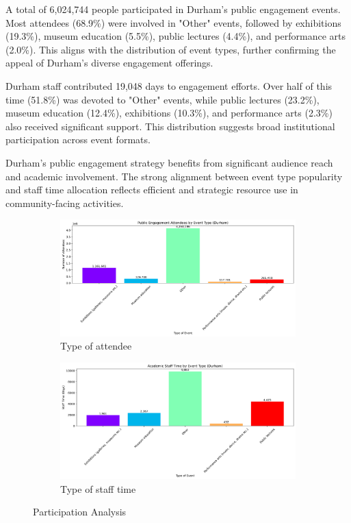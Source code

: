 \documentclass[journal,onecolumn, 10pt,draftclsnofoot]{IEEEtran}
\begin{document}
A total of 6,024,744 people participated in Durham's public engagement events. Most attendees (68.9\%) were involved in "Other" events, followed by exhibitions (19.3\%), museum education (5.5\%), public lectures (4.4\%), and performance arts (2.0\%). This aligns with the distribution of event types, further confirming the appeal of Durham's diverse engagement offerings.

Durham staff contributed 19,048 days to engagement efforts. Over half of this time (51.8\%) was devoted to "Other" events, while public lectures (23.2\%), museum education (12.4\%), exhibitions (10.3\%), and performance arts (2.3\%) also received significant support. This distribution suggests broad institutional participation across event formats.



Durham's public engagement strategy benefits from significant audience reach and academic involvement. The strong alignment between event type popularity and staff time allocation reflects efficient and strategic resource use in community-facing activities.

\begin{figure}[h]
\centering
\begin{subfigure}[b]{0.48\textwidth}
    \centering
    \includegraphics[width=\textwidth]{Fig/figure32.attendees_by_type.png}
    \caption{Type of attendee}
    \label{fig:attendees-by-type}
\end{subfigure}
\hfill
\begin{subfigure}[b]{0.48\textwidth}
    \centering
    \includegraphics[width=\textwidth]{Fig/figure33.staff_time_by_type.png}
    \caption{Type of staff time}
    \label{fig:staff-time-by-type}
\end{subfigure}
\vspace{0.6cm}
\caption{Participation Analysis}
\label{fig:participation-analysis}
\end{figure}
\end{document}
